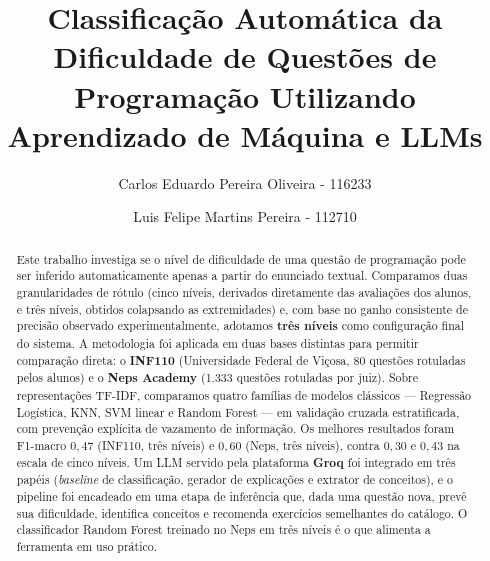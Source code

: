 \documentclass[sigconf]{webmedia}
\begin{document}
\title{Classificação Automática da Dificuldade de Questões de Programação Utilizando Aprendizado de Máquina e LLMs}

\author{Carlos Eduardo Pereira Oliveira - 116233}

\author{Luis Felipe Martins Pereira - 112710}
\renewcommand{\shortauthors}{Oliveira e Pereira}

\begin{abstract}
Este trabalho investiga se o nível de dificuldade de uma questão de programação pode ser inferido automaticamente apenas a partir do enunciado textual. Comparamos duas granularidades de rótulo (cinco níveis, derivados diretamente das avaliações dos alunos, e três níveis, obtidos colapsando as extremidades) e, com base no ganho consistente de precisão observado experimentalmente, adotamos \textbf{três níveis} como configuração final do sistema. A metodologia foi aplicada em duas bases distintas para permitir comparação direta: o \textbf{INF110} (Universidade Federal de Viçosa, 80 questões rotuladas pelos alunos) e o \textbf{Neps Academy} (1.333 questões rotuladas por juiz). Sobre representações TF-IDF, comparamos quatro famílias de modelos clássicos --- Regressão Logística, KNN, SVM linear e Random Forest --- em validação cruzada estratificada, com prevenção explícita de vazamento de informação. Os melhores resultados foram F1-macro $0{,}47$ (INF110, três níveis) e $0{,}60$ (Neps, três níveis), contra $0{,}30$ e $0{,}43$ na escala de cinco níveis. Um LLM servido pela plataforma \textbf{Groq} foi integrado em três papéis (\textit{baseline} de classificação, gerador de explicações e extrator de conceitos), e o pipeline foi encadeado em uma etapa de inferência que, dada uma questão nova, prevê sua dificuldade, identifica conceitos e recomenda exercícios semelhantes do catálogo. O classificador Random Forest treinado no Neps em três níveis é o que alimenta a ferramenta em uso prático.
\end{abstract}


\maketitle
\end{document}
